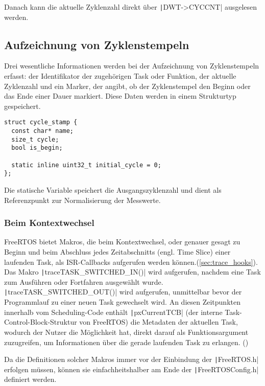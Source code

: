 Danach kann die aktuelle Zyklenzahl direkt über \texttt|DWT->CYCCNT|
ausgelesen werden.

\subsection{Aufzeichnung von Zyklenstempeln}

Drei wesentliche Informationen werden bei der Aufzeichnung von Zyklenstempeln
erfasst: der Identifikator der zugehörigen Task oder Funktion, der aktuelle
Zyklenzahl und ein Marker, der angibt, ob der Zyklenstempel den Beginn oder das
Ende einer Dauer markiert. Diese Daten werden in einem Strukturtyp gespeichert.

\begin{code}
\begin{verbatim}
struct cycle_stamp {
  const char* name;
  size_t cycle;
  bool is_begin;

  static inline uint32_t initial_cycle = 0;
};
\end{verbatim}
\end{code}

Die statische Variable speichert die Ausgangszyklenzahl und dient als
Referenzpunkt zur Normalisierung der Messwerte.

\subsubsection{Beim Kontextwechsel}

FreeRTOS bietet Makros, die beim Kontextwechsel, oder genauer gesagt zu Beginn
und beim Abschluss jedes Zeitabschnitts (engl. Time Slice) einer laufenden Task,
als ISR-Callbacks aufgerufen werden können.(\ref{sec:trace_hooks}). Das Makro
\texttt|traceTASK_SWITCHED_IN()| wird aufgerufen, nachdem eine Task zum
Ausführen oder Fortfahren ausgewählt wurde.
\texttt|traceTASK_SWITCHED_OUT()| wird aufgerufen, unmittelbar bevor
der Programmlauf zu einer neuen Task gewechselt wird. An diesen Zeitpunkten
innerhalb vom Scheduling-Code enthält \texttt|pxCurrentTCB| (der
interne Task-Control-Block-Struktur von FreeRTOS) die Metadaten der aktuellen
Task, wodurch der Nutzer die Möglichkeit hat, direkt darauf als
Funktionsargument zuzugreifen, um Informationen über die gerade laufenden Task
zu erlangen. (\cite{freertos_rtos_trace_hooks})

Da die Definitionen solcher Makros immer vor der Einbindung der
\texttt|FreeRTOS.h| erfolgen müssen, können sie einfachheitshalber
am Ende der \texttt|FreeRTOSConfig.h| definiert werden.

